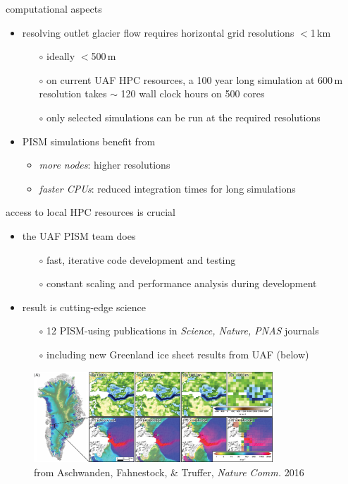 \documentclass[hide notes,intlimits]{beamer}
\begin{document}
\begin{frame}{computational aspects}
  
  \begin{itemize}
  \item resolving outlet glacier flow requires horizontal grid resolutions $<$1\,km
       \begin{itemize}
       \item[$\circ$] ideally $<$500\,m
       \item[$\circ$] on current UAF HPC resources, a 100 year long simulation at 600\,m resolution takes $\sim$ 120 wall clock hours on 500 cores
       \item[$\circ$] only selected simulations can be run at the required resolutions
       \end{itemize}
  \item PISM simulations benefit from
    \begin{itemize}
    \item \emph{more nodes}: higher resolutions
    \item \emph{faster CPUs}: reduced integration times for long simulations
    \end{itemize}
\end{itemize}
\end{frame}


\begin{frame}{access to local HPC resources is crucial}

    \begin{itemize}
    \item the UAF PISM team does
       \begin{itemize}
       \item[$\circ$] fast, iterative code development and testing
       \item[$\circ$] constant scaling and performance analysis during development
       \end{itemize}    
    \item result is cutting-edge science
       \begin{itemize}
       \item[$\circ$] 12 PISM-using publications in \emph{Science, Nature, PNAS} journals
       \item[$\circ$] including new Greenland ice sheet results from UAF (below)
       \end{itemize}
    \end{itemize}

\begin{figure}
    \includegraphics[width=0.8\textwidth]{jakobshavn-beds}
    \\ \hfill \scriptsize from Aschwanden, Fahnestock, \& Truffer, \emph{Nature Comm.} 2016
\end{figure}
\end{frame}
\end{document}
